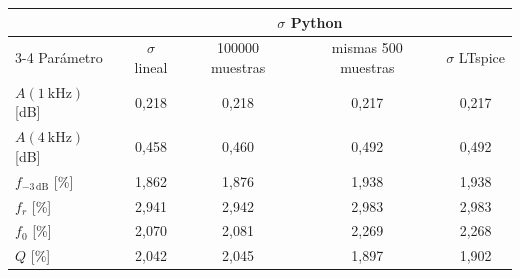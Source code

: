 \begin{tabular}{@{}lcccc@{}}
\toprule
& & \multicolumn{2}{c}{$\sigma$ Python} & \\ \cmidrule(lr){3-4} Parámetro & $\sigma$ lineal & \num{100000} muestras & mismas \num{500} muestras & $\sigma$ LTspice \\
\midrule
$A(\qty{1}{\kilo\hertz})$ [dB] & 0{,}218 & 0{,}218 & 0{,}217 & 0{,}217 \\
$A(\qty{4}{\kilo\hertz})$ [dB] & 0{,}458 & 0{,}460 & 0{,}492 & 0{,}492 \\
$f_{-3\,\text{dB}}$ [\%] & 1{,}862 & 1{,}876 & 1{,}938 & 1{,}938 \\
$f_r$ [\%] & 2{,}941 & 2{,}942 & 2{,}983 & 2{,}983 \\
$f_0$ [\%] & 2{,}070 & 2{,}081 & 2{,}269 & 2{,}268 \\
$Q$ [\%] & 2{,}042 & 2{,}045 & 1{,}897 & 1{,}902 \\
\bottomrule
\end{tabular}
